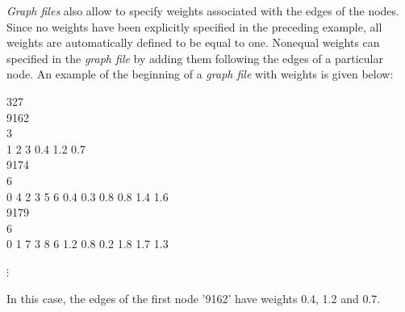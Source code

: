 {\em Graph files} also allow to specify weights associated with the edges of the nodes. Since no weights have been explicitly specified in the preceding example, all weights are automatically defined to be equal to one. Nonequal weights can specified in the {\em graph file} by adding them following the edges of a particular node. An example of the beginning of a {\em graph file} with weights is given below:

\footnotesize

327 \\
9162 \\
3 \\
1 2 3 0.4 1.2 0.7\\
9174 \\
6 \\
0 4 2 3 5 6 0.4 0.3 0.8 0.8 1.4 1.6\\
9179 \\
6 \\
0 1 7 3 8 6 1.2 0.8 0.2 1.8 1.7 1.3

\hspace{1cm} $\vdots$

\normalsize

\vspace{0.5cm}

In this case, the edges of the first node '9162' have weights 0.4, 1.2 and 0.7.\bigskip


